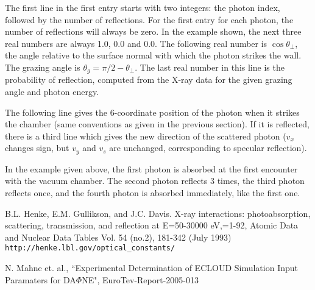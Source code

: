 \documentclass[11pt,landscape]{article}
\begin{document}
The first line in the first entry starts with two integers: the photon
index, followed by the number of reflections. For the first entry for
each photon, the number of reflections will always be zero. In the
example shown, the next three real numbers are always 1.0, 0.0 and
0.0. The following real number is $\cos{\theta_\perp}$, the angle
relative to the surface normal with which the photon strikes the
wall. The grazing angle is $\theta_g=\pi/2-\theta_\perp.$ The last
real number in this line is the probability of reflection, computed
from the X-ray data for the given grazing angle and photon energy.

The following line gives the 6-coordinate position of the photon when
it strikes the chamber (same conventions as given in the previous
section). If it is reflected, there is a third line which gives the
new direction of the scattered photon ($v_x$ changes sign, but $v_y$
and $v_s$ are unchanged, corresponding to specular reflection).

In the example given above, the first photon is absorbed at the first
encounter with the vacuum chamber. The second photon reflects 3 times,
the third photon reflects once, and the fourth photon is absorbed
immediately, like the first one.

\begin{thebibliography}{}

 B.L. Henke, E.M. Gullikson, and J.C. Davis. X-ray interactions: photoabsorption, scattering, transmission, and reflection at E=50-30000 eV,=1-92, Atomic Data and Nuclear Data Tables Vol. 54 (no.2), 181-342 (July 1993) {\tt http://henke.lbl.gov/optical\_constants/}

N. Mahne et. al., ``Experimental Determination of ECLOUD Simulation Input
Paramaters for DA$\Phi$NE", EuroTev-Report-2005-013
\end{thebibliography}{}
\end{document}
